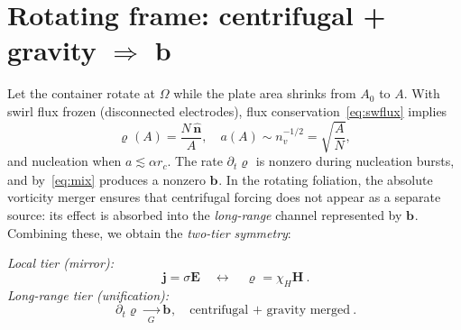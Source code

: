 \documentclass[10pt,reprint,aps,onecolumn,nofootinbib]{revtex4-2}
\def\boldsymbol#1{#1}%
\def\mathcal#1{#1}%
\def\swirlarrow{}%
\DeclareRobustCommand{\swirlarrow}{%
    \mathchoice{\mkern-2mu\scriptstyle\boldsymbol{\circlearrowleft}}%
    {\mkern-2mu\scriptstyle\boldsymbol{\circlearrowleft}}%
    {\mkern-2mu\scriptscriptstyle\boldsymbol{\circlearrowleft}}%
    {\mkern-2mu\scriptscriptstyle\boldsymbol{\circlearrowleft}}%
}
\begin{document}
\section{Rotating frame: centrifugal + gravity \texorpdfstring{$\Rightarrow$ $\mathbf b$}{->b}}
Let the container rotate at $\boldsymbol\Omega$ while the plate area shrinks from $A_0$ to $A$. With swirl flux frozen (disconnected electrodes), flux conservation~\ref{eq:swflux} implies
\begin{equation}
\bm{\varrho}_{\swirlarrow}(A) = \frac{N \,\hat{\mathbf n}}{A},
\quad a(A)\sim n_v^{-1/2}=\sqrt{\frac{A}{N}},
\end{equation}
and nucleation when $a\lesssim \alpha r_c$. The rate $\partial_t \bm{\varrho}_{\swirlarrow}$ is nonzero during nucleation bursts, and by~\ref{eq:mix} produces a nonzero $\mathbf b_{\swirlarrow}$. In the rotating foliation, the absolute vorticity merger ensures that centrifugal forcing does not appear as a separate source: its effect is absorbed into the \emph{long-range} channel represented by $\mathbf b_{\swirlarrow}$. Combining these, we obtain the \emph{two-tier symmetry}:

\medskip
\noindent\emph{Local tier (mirror):}
\[
    \boxed{\ \mathbf j=\sigma\mathbf E \quad \leftrightarrow \quad \bm{\varrho}_{\swirlarrow}=\chi_H\mathbf H\ }.
\]
\noindent\emph{Long-range tier (unification):}
    \[
        \boxed{\
            \partial_t \bm{\varrho}_{\swirlarrow}
            \xrightarrow[\ \ \mathcal{G}_{\swirlarrow}\ \ ]{}
            \mathbf b_{\swirlarrow},
            \quad \text{centrifugal + gravity merged}\
        }.
    \]

\end{document}
